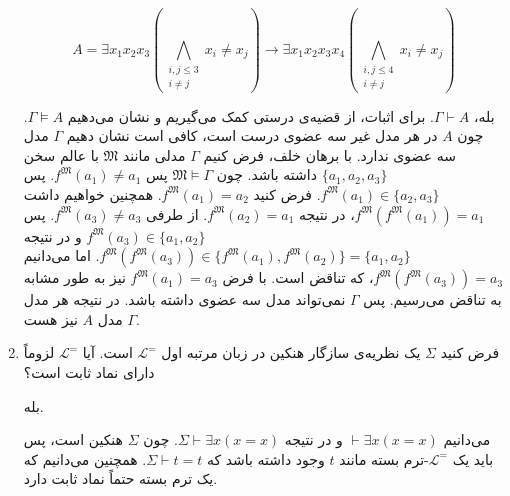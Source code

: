 \documentclass[12pt, 14paper]{article}
\begin{document}
\begin{enumerate}
\begin{ans}
    $$A = \exists x_1 x_2 x_3 (\bigwedge_{\substack{i,j \leq 3 \\ i \neq j}} x_i \neq x_j) \rightarrow \exists x_1 x_2 x_3 x_4 (\bigwedge_{\substack{i,j \leq 4 \\ i \neq j}} x_i \neq x_j)$$

    بله، $\Gamma \vdash A$. برای اثبات، از قضیه‌ی درستی کمک می‌گیریم و نشان می‌دهیم $\Gamma \vDash A$. چون $A$ در هر مدل غیر سه عضوی درست است، کافی است نشان دهیم $\Gamma$ مدل سه عضوی ندارد. با برهان خلف، فرض کنیم $\Gamma$ مدلی مانند $\mathfrak{M}$ با عالم سخن $\{ a_1, a_2, a_3 \}$ داشته باشد. چون $\mathfrak{M} \vDash \Gamma$ پس $f^\mathfrak{M}(a_1) \neq a_1$. پس $f^\mathfrak{M}(a_1) \in \{ a_2, a_3 \}$. فرض کنید $f^\mathfrak{M}(a_1) = a_2$. همچنین خواهیم داشت $f^\mathfrak{M}(f^\mathfrak{M}(a_1)) = a_1$، در نتیجه $f^\mathfrak{M}(a_2) = a_1$. از طرفی $f^\mathfrak{M}(a_3) \neq a_3$. پس $f^\mathfrak{M}(a_3) \in \{ a_1, a_2 \}$ و در نتیجه $f^\mathfrak{M}(f^\mathfrak{M}(a_3)) \in \{ f^\mathfrak{M}(a_1), f^\mathfrak{M}(a_2) \} = \{ a_1, a_2 \}$. اما می‌دانیم $f^\mathfrak{M}(f^\mathfrak{M}(a_3)) = a_3$، که تناقض است. با فرض $f^\mathfrak{M}(a_1) = a_3$ نیز به طور مشابه به تناقض می‌رسیم. پس $\Gamma$ نمی‌تواند مدل سه عضوی داشته باشد. در نتیجه هر مدل $\Gamma$ مدل $A$ نیز هست.
\end{ans}

\item فرض کنید $\Sigma$ یک نظریه‌ی سازگار هنکین در زبان مرتبه اول $\mathcal{L}^=$ است. آیا $\mathcal{L}^=$ لزوماً دارای نماد ثابت است؟
\begin{ans}
  بله.
  
  می‌دانیم $\vdash \exists x (x = x)$ و در نتیجه $\Sigma \vdash \exists x (x = x)$. چون $\Sigma$ هنکین است، پس باید یک $\mathcal{L}^=$-ترم بسته مانند $t$ وجود داشته باشد که $\Sigma \vdash t = t$. همچنین می‌دانیم که یک ترم بسته حتماً نماد ثابت دارد.
\end{ans}


\end{enumerate}
\end{document}
